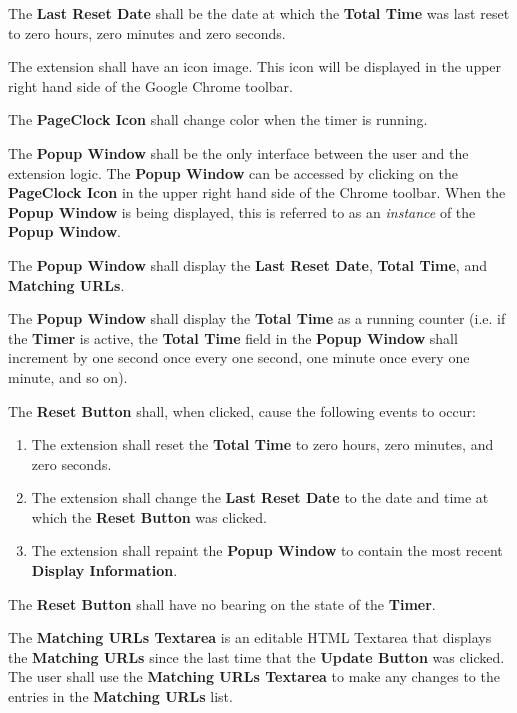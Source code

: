 \documentclass{designdoc}
\begin{document}
The \textbf{Last Reset Date} shall be the date at which the \textbf{Total Time}
was last reset to zero hours, zero minutes and zero seconds.

The extension shall have an icon image. This icon will be displayed in the
upper right hand side of the Google Chrome toolbar.

The \textbf{PageClock Icon} shall change color when the timer is running.

The \textbf{Popup Window} shall be the only interface between the user and the
extension logic. The \textbf{Popup Window} can be accessed by clicking on the
\textbf{PageClock Icon} in the upper right hand side of the Chrome toolbar.
When the \textbf{Popup Window} is being displayed, this is referred to as an
\textit{instance} of the \textbf{Popup Window}.

The \textbf{Popup Window} shall display the \textbf{Last Reset Date},
\textbf{Total Time}, and \textbf{Matching URLs}.

The \textbf{Popup Window} shall display the \textbf{Total Time} as a running
counter (i.e. if the \textbf{Timer} is active, the \textbf{Total Time} field in
the \textbf{Popup Window} shall increment by one second once every one second,
one minute once every one minute, and so on).

The \textbf{Reset Button} shall, when clicked, cause the following events to
occur:
\begin{enumerate}
\item The extension shall reset the \textbf{Total Time} to zero hours, zero
  minutes, and zero seconds.
\item The extension shall change the \textbf{Last Reset Date} to the date and
  time at which the \textbf{Reset Button} was clicked.
\item The extension shall repaint the \textbf{Popup Window} to contain the most
  recent \textbf{Display Information}.
\end{enumerate}
The \textbf{Reset Button} shall have no bearing on the state of the
\textbf{Timer}.

The \textbf{Matching URLs Textarea} is an editable HTML Textarea that displays
the \textbf{Matching URLs} since the last time that the \textbf{Update Button}
was clicked. The user shall use the \textbf{Matching URLs Textarea} to make any
changes to the entries in the \textbf{Matching URLs} list.
\end{document}
